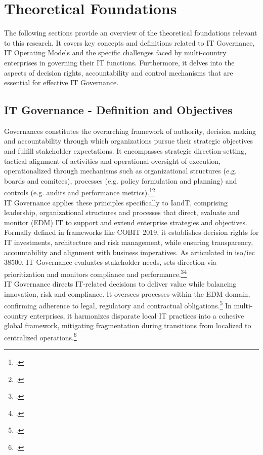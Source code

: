 \newpage
\section{Theoretical Foundations}
\label{sec:TheoreticalFoundations}
The following sections provide an overview of the theoretical foundations relevant to this research.
It covers key concepts and definitions related to IT Governance, IT Operating Models and the specific challenges faced by multi-country enterprises in governing their IT functions.
Furthermore, it delves into the aspects of decision rights, accountability and control mechanisms that are essential for effective IT Governance.
\subsection{IT Governance - Definition and Objectives}
\label{subsec:ITGovernanceDefinitionAndObjectives}
Governances constitutes the overarching framework of authority, decision making and accountability through which organizations pursue their strategic objectives and fulfill stakeholder expectations.
It encompasses strategic direction-setting, tactical alignment of activities and operational oversight of execution, operationalized through mechanisms such as organizational structures (e.g. boards and comitees), processes (e.g. policy formulation and planning) and controls (e.g. audits and performance metrics).\footcite[12]{isacaCOBIT2019Framework2018}\footcite[2]{emryITGovernanceGuide2024}
\\
IT Governance applies these principles specifically to \ac{IandT}, comprising leadership, organizational structures and processes that direct, evaluate and monitor (EDM) \ac{IT} to support and extend enterprise strategies and objectives.
Formally defined in frameworks like COBIT 2019, it establishes decision rights for IT investments, architecture and risk management, while ensuring transparency, accountability and alignment with business imperatives.
As articulated in \ac{iso}/\ac{iec} 38500, IT Governance evaluates stakeholder needs, sets direction via prioritization and monitors compliance and performance.\footcite[12]{isacaCOBIT2019Framework2018}\footcite[2]{emryITGovernanceGuide2024}
\\
IT Governance directs IT-related decisions to deliver value while balancing innovation, risk and compliance.
It oversees processes within the \ac{EDM} domain, confirming adherence to legal, regulatory and contractual obligations.\footcite[29-33]{isacaCOBIT2019Framework2018a}
In multi-country enterprises, it harmonizes disparate local IT practices into a cohesive global framework, mitigating fragmentation during transitions from localized to centralized operations.\footcite[3-4]{ionitaITGovernanceGlobal2009}
